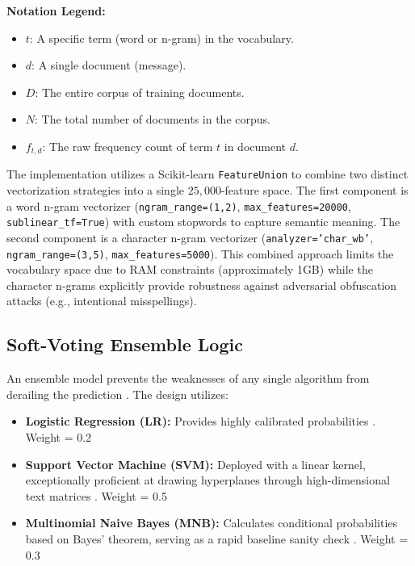 \textbf{Notation Legend:}
\begin{itemize}
    \item $t$: A specific term (word or n-gram) in the vocabulary.
    \item $d$: A single document (message).
    \item $D$: The entire corpus of training documents.
    \item $N$: The total number of documents in the corpus.
    \item $f_{t,d}$: The raw frequency count of term $t$ in document $d$.
\end{itemize}

The implementation utilizes a Scikit-learn \texttt{FeatureUnion} \cite{pedregosa2011scikit} to combine two distinct vectorization strategies into a single $25,000$-feature space. The first component is a word n-gram vectorizer (\texttt{ngram\_range=(1,2)}, \texttt{max\_features=20000}, \texttt{sublinear\_tf=True}) with custom stopwords to capture semantic meaning. The second component is a character n-gram vectorizer (\texttt{analyzer='char\_wb'}, \texttt{ngram\_range=(3,5)}, \texttt{max\_features=5000}). This combined approach limits the vocabulary space due to RAM constraints (approximately 1GB) while the character n-grams explicitly provide robustness against adversarial obfuscation attacks (e.g., intentional misspellings).

\subsection{Soft-Voting Ensemble Logic}
An ensemble model prevents the weaknesses of any single algorithm from derailing the prediction \cite{dietterich2000ensemble}. The design utilizes:
\begin{itemize}
    \item \textbf{Logistic Regression (LR):} Provides highly calibrated probabilities \cite{cox1958regression}. Weight = 0.2
    \item \textbf{Support Vector Machine (SVM):} Deployed with a linear kernel, exceptionally proficient at drawing hyperplanes through high-dimensional text matrices \cite{cortes1995support}. Weight = 0.5
    \item \textbf{Multinomial Naive Bayes (MNB):} Calculates conditional probabilities based on Bayes' theorem, serving as a rapid baseline sanity check \cite{mccallum1998comparison}. Weight = 0.3
\end{itemize}

